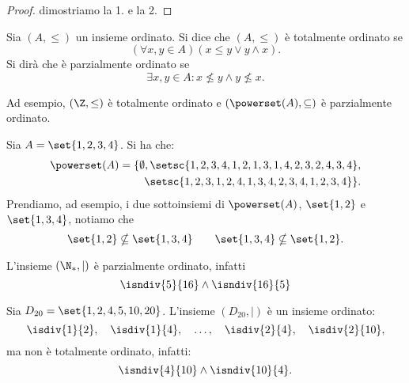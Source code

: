 \begin{proof}
    dimostriamo la 1. e la 2.
\end{proof}



\begin{definition}\label{def:insieme_totalmente_ordinato}
    Sia \((A, \leq)\) un insieme ordinato. Si dice che \((A, \leq)\) è totalmente ordinato se
    \[
        (\forall x,y \in A) (x \leq y \lor y \land x).
    \]
    Si dirà che è parzialmente ordinato se
    \[
        \exists x,y \in A : x \nleq y \land y \nleq x.
    \]
\end{definition}

Ad esempio, \((\Z, \leq)\) è totalmente ordinato e \((\powerset(A), \subseteq)\) è parzialmente ordinato.

\begin{example}
    Sia \(A = \set{1, 2, 3, 4}\). Si ha che:
    \begin{equation*}
    \begin{split}
        \powerset(A) = \{\emptyset,
            \setsc{1, 2, 3, 4, {1, 2}, {1, 3}, {1, 4}, {2, 3}, {2, 4}, {3, 4}}, \\
            \setsc{{1, 2, 3}, {1, 2, 4}, {1, 3, 4}, {2, 3, 4}, {1, 2, 3, 4}}
        \}.
    \end{split}
    \end{equation*}
    Prendiamo, ad esempio, i due sottoinsiemi di \(\powerset(A)\), \(\set{1, 2}\) e \(\set{1, 3, 4}\), notiamo che
    \[
        \set{1, 2} \nsubseteq \set{1, 3, 4}
        \qquad
        \set{1, 3, 4} \nsubseteq \set{1, 2}.
    \]
\end{example}

\begin{example}
    L'insieme \((\N_*, \mid)\) è parzialmente ordinato, infatti
    \[
        \isndiv{5}{16} \land \isndiv{16}{5}
    \]
\end{example}

\begin{example}
    Sia \(D_{20} = \set{1, 2, 4, 5, 10, 20}\). L'insieme \((D_{20}, \mid)\) è un insieme ordinato:
    \[
        \isdiv{1}{2}, \quad
        \isdiv{1}{4}, \quad
        \dotsc,       \quad
        \isdiv{2}{4}, \quad
        \isdiv{2}{10},
    \]
    ma non è totalmente ordinato, infatti:
    \[
        \isndiv{4}{10} \land \isndiv{10}{4}.
    \]
\end{example}

